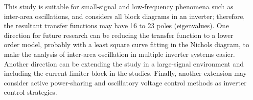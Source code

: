 This study is suitable for small-signal and low-frequency phenomena such as inter-area oscillations, and considers all block diagrams in an inverter; therefore, the resultant transfer functions may have 16 to 23 poles (eigenvalues). One direction for future research can be reducing the transfer function to a lower order model, probably with a least square curve fitting in the Nichols diagram, to make the analysis of inter-area oscillation in multiple inverter systems easier. Another direction can be extending the study in a large-signal environment and including the current limiter block in the studies. Finally, another extension may consider active power-sharing and oscillatory voltage control methods as inverter control strategies. 

